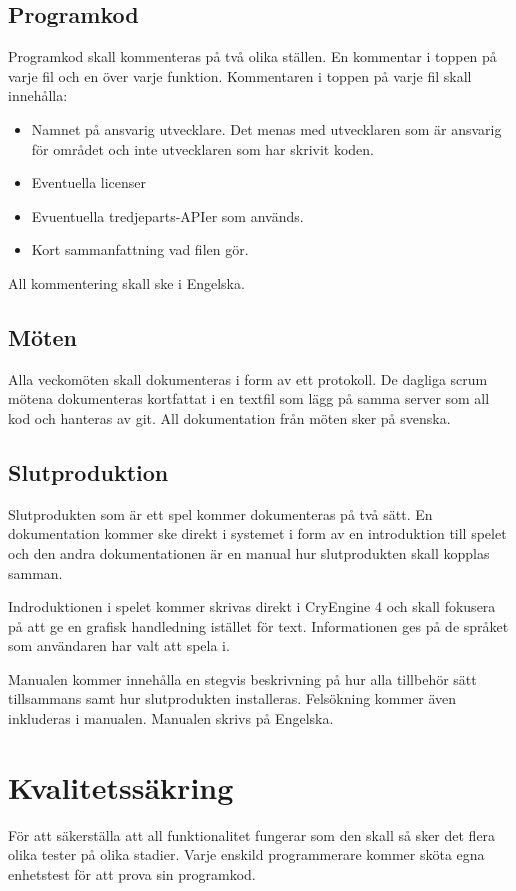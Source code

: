 \documentclass[a4paper,12pt,oneside,final]{extbook}
\begin{document}
\subsection{Programkod}
Programkod skall kommenteras på två olika ställen. En kommentar i toppen på varje fil och en över varje funktion. Kommentaren i toppen på varje fil skall innehålla:
\begin{itemize}
	\item Namnet på ansvarig utvecklare. Det menas med utvecklaren som är ansvarig för området och inte utvecklaren som har skrivit koden.
	\item Eventuella licenser
	\item Evuentuella tredjeparts-APIer som används.
	\item Kort sammanfattning vad filen gör.
\end{itemize}
All kommentering skall ske i Engelska.
\subsection{Möten}
Alla veckomöten skall dokumenteras i form av ett protokoll. De dagliga scrum mötena dokumenteras kortfattat i en textfil som lägg på samma server som all kod och hanteras av git. All dokumentation från möten sker på svenska.
\subsection{Slutproduktion}
Slutprodukten som är ett spel kommer dokumenteras på två sätt. En dokumentation kommer ske direkt i systemet i form av en introduktion till spelet och den andra dokumentationen är en manual hur slutprodukten skall kopplas samman. 

Indroduktionen i spelet kommer skrivas direkt i CryEngine 4 och skall fokusera på att ge en grafisk handledning istället för text. Informationen ges på de språket som användaren har valt att spela i.

Manualen kommer innehålla en stegvis beskrivning på hur alla tillbehör sätt tillsammans samt hur slutprodukten installeras. Felsökning kommer även inkluderas i manualen. Manualen skrivs på Engelska.

\section{Kvalitetssäkring}
För att säkerställa att all funktionalitet fungerar som den skall så sker det flera olika tester på olika stadier. Varje enskild programmerare kommer sköta egna enhetstest för att prova sin programkod. 
\end{document}
